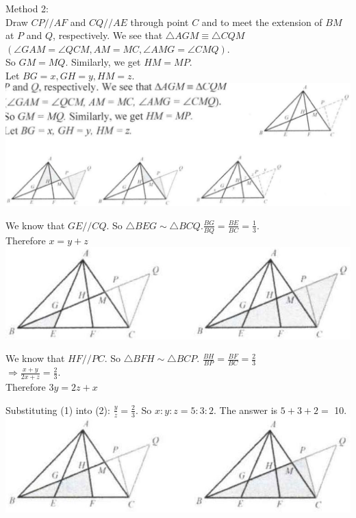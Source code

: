 \documentclass[10pt]{article}
\begin{document}
Method 2:\\
Draw \(C P / / A F\) and \(C Q / / A E\) through point \(C\) and to meet the extension of \(B M\) at \(P\) and \(Q\), respectively. We see that \(\triangle A G M \equiv \triangle C Q M\)\\
\((\angle G A M=\angle Q C M, A M=M C, \angle A M G=\angle C M Q)\).\\
So \(G M=M Q\). Similarly, we get \(H M=M P\).\\
Let \(B G=x, G H=y, H M=z\).\\
\includegraphics[max width=\textwidth, center]{2025_04_17_97bc1f7e44d93c271a88g-119(2)}

We know that \(G E / / C Q\). So \(\triangle B E G \sim \triangle B C Q . \frac{B G}{B Q}=\frac{B E}{B C}=\frac{1}{3}\).\\
Therefore \(x=y+z\)\\
\includegraphics[max width=\textwidth, center]{2025_04_17_97bc1f7e44d93c271a88g-119(1)}

We know that \(H F / / P C\). So \(\triangle B F H \sim \triangle B C P\). \(\frac{B H}{B P}=\frac{B F}{B C}=\frac{2}{3}\)\\
\(\Rightarrow \frac{x+y}{2 x+z}=\frac{2}{3}\).\\
Therefore \(3 y=2 z+x\)


Substituting (1) into (2): \(\frac{y}{z}=\frac{2}{3}\). So \(x: y: z=5: 3: 2\). The answer is \(5+3+2=\) 10.\\
\includegraphics[max width=\textwidth, center]{2025_04_17_97bc1f7e44d93c271a88g-120(2)}
\end{document}
